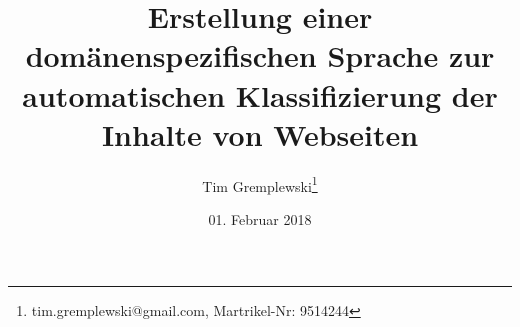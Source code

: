 \documentclass[abstract=on,parskip=half,titlepage,twoside,openright]{scrreprt}
\title{Erstellung einer domänenspezifischen Sprache zur automatischen Klassifizierung der Inhalte von Webseiten}
\author{Tim Gremplewski\thanks{tim.gremplewski@gmail.com, Martrikel-Nr: 9514244}}
\date{01. Februar 2018}
\begin{document}
	\maketitle

	\begin{abstract}
		
	\end{abstract}

	\cleardoublepage

	\begingroup
		\let\cleardoublepage\relax
		\tableofcontents
		\listoffigures
		\listoftables
		\lstlistoflistings
	\endgroup

	\newpage

	
	
	
	
	
	
	
	\sloppy
	\printbibliography[heading=bibintoc]
\end{document}
